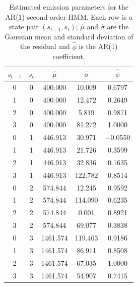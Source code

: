 \begin{table}[ht]
\centering
\begin{tabular}{ccccc}
\hline
$s_{t-1}$ & $s_t$ & $\hat{\mu}$ & $\hat{\sigma}$ & $\hat{\phi}$ \\
\hline
0 & 0 &  400.000 &   10.009 &  0.6797 \\
1 & 0 &  400.000 &   12.472 &  0.2649 \\
2 & 0 &  400.000 &    5.819 &  0.9871 \\
3 & 0 &  400.000 &   81.272 &  1.0000 \\
\hline
0 & 1 &  446.913 &   30.971 & $-0.0550$ \\
1 & 1 &  446.913 &   21.726 &  0.3599 \\
2 & 1 &  446.913 &   32.836 &  0.1635 \\
3 & 1 &  446.913 &  122.782 &  0.8514 \\
\hline
0 & 2 &  574.844 &   12.245 &  0.9592 \\
1 & 2 &  574.844 &  114.090 &  0.6235 \\
2 & 2 &  574.844 &    0.001 &  0.8921 \\
3 & 2 &  574.844 &   69.077 &  0.3838 \\
\hline
0 & 3 & 1461.574 &  119.463 &  0.9186 \\
1 & 3 & 1461.574 &   86.911 &  0.8508 \\
2 & 3 & 1461.574 &   67.035 &  1.0000 \\
3 & 3 & 1461.574 &   54.907 &  0.7415 \\
\hline
\end{tabular}
\caption{Estimated emission parameters for the AR(1) second-order HMM. Each row is a state pair $(s_{t-1}, s_t)$; $\hat{\mu}$ and $\hat{\sigma}$ are the Gaussian mean and standard deviation of the residual and $\hat{\phi}$ is the AR(1) coefficient.}
\label{tab:second_order_hmm_emissions}
\end{table}
